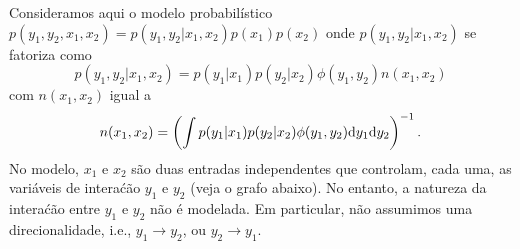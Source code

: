 Consideramos aqui o modelo probabil\'istico $p(y_1,y_2,x_1,x_2) = p(y_1, y_2 | x_1, x_2)p(x_1) p(x_2)$ onde $p(y_1, y_2 | x_1, x_2)$ se fatoriza como
\begin{equation}
p(y_1, y_2 | x_1, x_2) = p(y_1 | x_1) p(y_2 | x_2) \phi(y_1,y_2) n(x_1,x_2)
\end{equation}
com $n(x_1,x_2)$ igual a
\begin{equation}
n(x_1,x_2) = \left(\int p(y_1 | x_1) p(y_2 | x_2) \phi(y_1,y_2) \mathrm{d} y_1 \mathrm{d} y_2\right)^{-1}.
\label{eq:ndef-alt}
\end{equation}
No modelo, $x_1$ e $x_2$ s\~ao duas entradas independentes que controlam, cada uma, as vari\'aveis de intera\'c\~ao $y_1$ e $y_2$ (veja o grafo abaixo). No entanto, a natureza da intera\'c\~ao entre $y_1$ e $y_2$ n\~ao \'e modelada. Em particular, n\~ao assumimos uma direcionalidade, i.e., $y_1 \rightarrow y_2$, ou $y_2 \rightarrow y_1$.

\begin{center}
\end{center}


